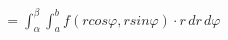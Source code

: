 \documentclass[preview]{standalone}
\begin{document}
\begin{align*}
= \int_{\alpha}^{\beta} \int_{a}^{b} f(rcos\varphi, rsin\varphi)\cdot r\, dr\, d\varphi
\end{align*}
\end{document}
